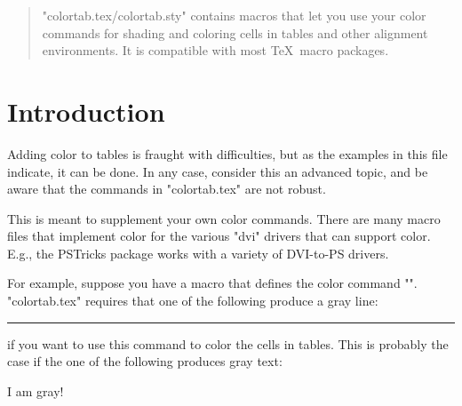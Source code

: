 \newcommand{\EndExample}{%
  \end{VerbatimOut}%
  \renewcommand{\EveryVerbatimLine}{}%
  \renewcommand{\EveryVerbatimCodes}{\catcode`\"=14}%
  \LVerbatimInput{\jobname.tmp}%
  \catcode`\"=9}

%
  {}

\if@test

\newenvironment{example}{\BeginExample}{\EndExample
  \begin{center}\leavevmode\end{center}}

\else

\newenvironment{example}{\VerbatimEnvironment\LVerbatim}{\endLVerbatim}

\fi

\makeatother



\maketitle

\begin{quote}
"colortab.tex/colortab.sty" contains macros that let you use your color
commands for shading and coloring cells in tables and other alignment
environments. It is compatible with most \TeX\ macro packages.
\end{quote}

\tableofcontents

\section{Introduction}

Adding color to tables is fraught with difficulties, but as the examples in
this file indicate, it can be done. In any case, consider this an advanced
topic, and be aware that the commands in "colortab.tex" are not robust.

This is meant to supplement your own color commands. There are many macro
files that implement color for the various "dvi" drivers that can support
color. E.g., the PSTricks package works with a variety of DVI-to-PS drivers.

For example, suppose you have a macro that defines the color command "\gray".
"colortab.tex" requires that one of the following produce a gray line:
\begin{LVerbatim}
  {\gray \hrule}
  \gray{\hrule}
\end{LVerbatim}
if you want to use this command to color the cells in tables.
This is probably the case if the one of the following produces gray text:
\begin{LVerbatim}
  {\gray I am gray!}
\end{LVerbatim}

